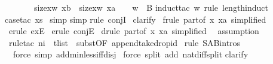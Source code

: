 \begin{isabellebody}
\ \ \ \ \ \ \ {\isacharparenleft}size{\isacharbrackleft}x{\isacharcolon}w{\isachardot}\ x{\isacharequal}b{\isacharbrackright}\ {\isacharequal}\ size{\isacharbrackleft}x{\isacharcolon}w{\isachardot}\ x{\isacharequal}a{\isacharbrackright}\ {\isacharplus}\ {}\ {\isacharminus}{\isacharminus}{\isachargreater}\ w\ {\isacharcolon}\ B{\isacharparenright}{\isachardoublequote}\isanewline
{}induct{\isacharunderscore}tac\ w\ rule{\isacharcolon}\ length{\isacharunderscore}induct{\isacharparenright}\isanewline
{}case{\isacharunderscore}tac\ {\isachardoublequote}xs{\isachardoublequote}{\isacharparenright}\isanewline
\ simp{\isacharparenright}\isanewline
{}simp{\isacharparenright}\isanewline
{}rule\ conjI{\isacharparenright}\isanewline
\ clarify{\isacharparenright}\isanewline
\ frule\ part{}{\isacharbrackleft}of\ {\isachardoublequote}{\isacharpercent}x{\isachardot}\ x{\isacharequal}a{\isachardoublequote}{\isacharcomma}\ simplified{\isacharbrackright}{\isacharparenright}\isanewline
\ erule\ exE{\isacharparenright}\isanewline
\ erule\ conjE{\isacharparenright}\isanewline
\ drule\ part{}{\isacharbrackleft}of\ {\isachardoublequote}{\isacharpercent}x{\isachardot}\ x{\isacharequal}a{\isachardoublequote}{\isacharcomma}\ simplified{\isacharbrackright}{\isacharparenright}\isanewline
\ \ assumption{\isacharparenright}\isanewline
\ rule{\isacharunderscore}tac\ n{}{\isacharequal}i\ \ t{\isacharequal}list\ \ subst{\isacharbrackleft}OF\ append{\isacharunderscore}take{\isacharunderscore}drop{\isacharunderscore}id{\isacharbrackright}{\isacharparenright}\isanewline
\ rule\ S{\isacharunderscore}A{\isacharunderscore}B{\isachardot}intros{\isacharparenright}\isanewline
\ \ force\ simp\ add{\isacharcolon}min{\isacharunderscore}less{\isacharunderscore}iff{\isacharunderscore}disj{\isacharparenright}\isanewline
\ force\ split\ add{\isacharcolon}\ nat{\isacharunderscore}diff{\isacharunderscore}split{\isacharparenright}\isanewline
{}clarify{\isacharparenright}\isanewline

\end{isabellebody}
